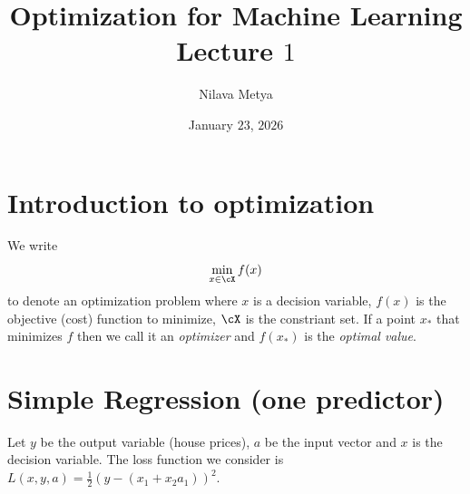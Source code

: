 
\usepackage{comment}
\usepackage{wrapfig}
\setlength{\columnsep}{0.7cm}

\usepackage[
backend=biber,
style=alphabetic,giveninits,
citestyle=ieee-alphabetic,
natbib=true,
uniquelist=false,
maxnames=10,
sorting=ynt
]{biblatex}
%


\title{\textbf{Optimization for Machine Learning}\\ Lecture $1$ }
\usepackage{quiver}
\usepackage[nobottomtitles*]{titlesec}
\usepackage{titletoc}

\author{Nilava Metya}
\date{\vspace{-0.7in}January $23$, $2026$}
\usepackage{pdfpages}
\usepackage{fancyhdr}
	\pagestyle{fancyplain}
	\fancyhf{}
	\fancyhead[R]{\thepage}
\newcommand{\fa}{~\forall~}
\usepackage{algpseudocode}
\renewcommand{\algorithmicrequire}{\textbf{Input:}}
\renewcommand{\algorithmicensure}{\textbf{Output:}}


\maketitle

\section{Introduction to optimization}
We write $$\min_{x\in \cX}f(x)$$ to denote an optimization problem where $x$ is a decision variable, $f(x)$ is the objective (cost) function to minimize, $\cX$ is the constriant set. If a point $x_{*}$ that minimizes $f$ then we call it an \textit{optimizer} and $f(x_{*})$ is the \textit{optimal value}.  

\section{Simple Regression (one predictor)}
Let $y$ be the output variable (house prices), $a$ be the input vector and $x$ is the decision variable. The loss function we consider is $L(x,y,a) = \frac12(y-(x_{1}+x_{2}a_{1}))^{2}$. 

